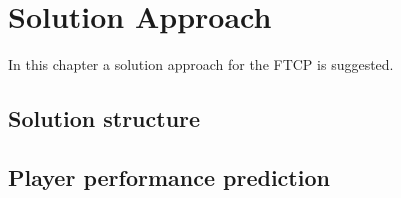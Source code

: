 

\chapter{Solution Approach} \label{chapter_solution_approach}

In this chapter a solution approach for the FTCP is suggested. 

\section{Solution structure}
\section{Player performance prediction}

